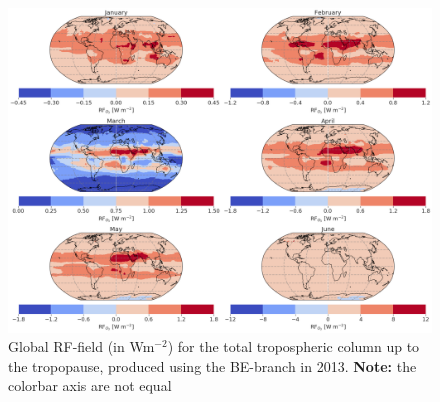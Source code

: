\begin{figure}[ht]
    \centering
    \includegraphics[width = \linewidth]{Chapter6_Results/images/RF/RF_USE/Appendix/BE_RF_global_2013.png}
    \caption{Global RF-field (in Wm$^{-2}$) for the total tropospheric column up to the tropopause, produced using the BE-branch in 2013. \textbf{Note:} the colorbar axis are not equal}
    \label{fig:BE_RF_global_2013}
\end{figure}